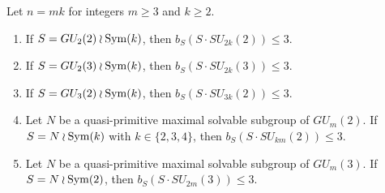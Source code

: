 \begin{Lem}\label{isklwr}
Let $n=mk$ for integers $m \ge 3$ and $k \ge 2$. 
\begin{enumerate}[font=\normalfont]
\item If $S=GU_2(2) \wr \mathrm{Sym}(k)$, then  $b_S(S \cdot SU_{2k}(2)) \le 3.$ \label{isklwr1}
\item If $S=GU_2(3) \wr \mathrm{Sym}(k)$, then $b_S(S \cdot SU_{2k}(3))\le 3.$ \label{isklwr2}
\item If $S=GU_3(2) \wr \mathrm{Sym}(k)$, then $b_S(S \cdot SU_{3k}(2))\le 3.$ \label{isklwr3}
\item Let $N$ be a  quasi-primitive maximal solvable  subgroup of $GU_m(2)$. If $S=N \wr \mathrm{Sym}(k)$ with $k \in \{2,3,4\}$, then $b_S(S \cdot SU_{km}(2))\le 3.$ \label{isklwr4}
\item Let $N$ be a  quasi-primitive maximal  solvable  subgroup of $GU_m(3)$. If $S=N \wr \mathrm{Sym}(2)$, then $b_S(S \cdot SU_{2m}(3))\le 3.$ \label{isklwr5}
\end{enumerate}
\end{Lem}
